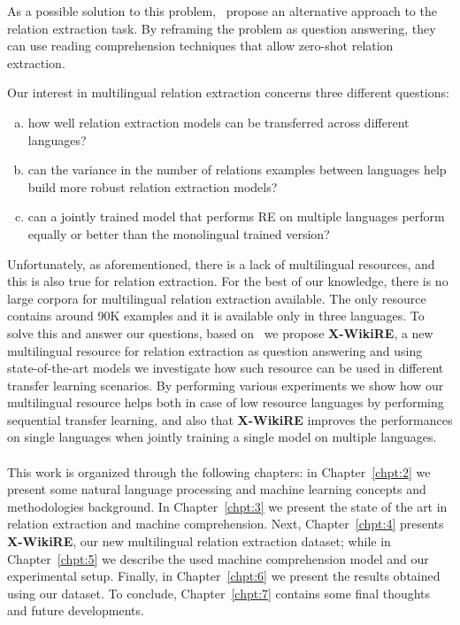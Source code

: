 As a possible solution to this problem,~\cite{levy2017zero} propose an alternative approach to the relation extraction task. By reframing the problem as question answering, they can use reading comprehension techniques that allow zero-shot relation extraction. 

Our interest in multilingual relation extraction concerns three different questions: \begin{enumerate}[a) , font=\bfseries, noitemsep]
    \item how well relation extraction models can be transferred across different languages?
    \item can the variance in the number of relations examples between languages help  build more robust relation extraction models?
    \item can a jointly trained model that performs RE on multiple languages perform equally or better than the monolingual trained version?
\end{enumerate}

Unfortunately, as aforementioned, there is a lack of multilingual resources, and this is also true for  relation extraction. For the best of our knowledge, there is no large corpora for multilingual relation extraction available. The only resource contains around 90K examples and it is available only in three languages. To solve this and answer our questions, based on~\citep{levy2017zero, hewlett2016wikireading} we propose \textbf{X-WikiRE}, a new multilingual resource for relation extraction as question answering and using state-of-the-art models we investigate how such resource can be used in different transfer learning scenarios. By performing various experiments we show how our multilingual resource helps both in case of low resource languages by performing sequential transfer learning, and also that \textbf{X-WikiRE} improves the performances on single languages when jointly training a single model on multiple languages.





\paragraph{}
This work is organized through the following chapters: in Chapter~\ref{chpt:2} we present some natural language processing and machine learning concepts and methodologies background. In Chapter~\ref{chpt:3} we present the state of the art in relation extraction and machine comprehension. Next, Chapter~\ref{chpt:4} presents \textbf{X-WikiRE}, our new multilingual relation extraction dataset; while in Chapter~\ref{chpt:5} we describe the used machine comprehension model and our experimental setup. Finally, in Chapter~\ref{chpt:6} we present the results obtained using our dataset. To conclude, Chapter~\ref{chpt:7} contains some final thoughts and future developments.